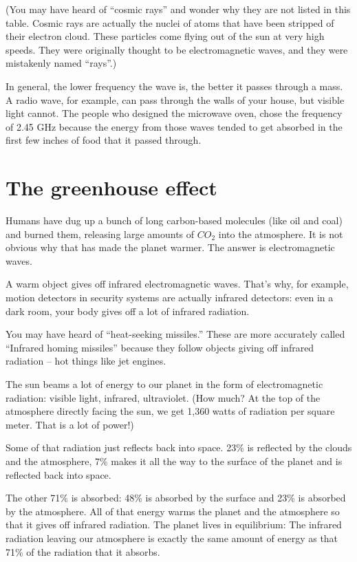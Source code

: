 (You may have heard of ``cosmic rays'' and wonder why they are
not listed in this table. Cosmic rays are actually the nuclei of atoms
that have been stripped of their electron cloud. These particles come
flying out of the sun at very high speeds. They were originally
thought to be electromagnetic waves, and they were mistakenly named
``rays''.)

In general, the lower frequency the wave is, the better it passes
through a mass.  A radio wave, for example, can pass through the walls
of your house, but visible light cannot.  The people who designed the
microwave oven, chose the frequency of 2.45 GHz because the energy
from those waves tended to get absorbed in the first few inches of
food that it passed through.

\section{The greenhouse effect}

Humans have dug up a bunch of long carbon-based molecules (like oil
and coal) and burned them, releasing large amounts of $CO_2$ into the
atmosphere. It is not obvious why that has made the planet warmer. The
answer is electromagnetic waves.

A warm object gives off infrared electromagnetic waves. That's why,
for example, motion detectors in security systems are actually
infrared detectors: even in a dark room, your body gives off a lot of
infrared radiation.

You may have heard of ``heat-seeking missiles.'' These are more
accurately called ``Infrared homing missiles'' because they follow
objects giving off infrared radiation -- hot things like jet engines.

The sun beams a lot of energy to our planet in the form of
electromagnetic radiation: visible light, infrared, ultraviolet. (How
much? At the top of the atmosphere directly facing the sun, we get
1,360 watts of radiation per square meter. That is a lot of power!)

Some of that radiation just reflects back into space.  23\% is
reflected by the clouds and the atmosphere, 7\% makes it all the way
to the surface of the planet and is reflected back into space.

The other 71\% is absorbed: 48\% is absorbed by the surface and 23\%
is absorbed by the atmosphere. All of that energy warms the planet and
the atmosphere so that it gives off infrared radiation. The planet
lives in equilibrium: The infrared radiation leaving our atmosphere is
exactly the same amount of energy as that 71\% of the radiation that
it absorbs.

